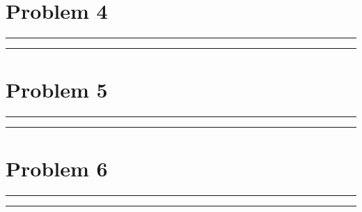\documentclass{article}
\theoremstyle{definition}
\newenvironment{solution}{\bigskip\hrule{\hfill}}{\bigskip\hrule{\hfill}} %
\begin{document}

\newpage


\section*{Problem 4}

\begin{solution}


\end{solution}


\newpage


\section*{Problem 5}

\begin{solution}


\end{solution}


\newpage


\section*{Problem 6}

\begin{solution}


\end{solution}
\end{document}
